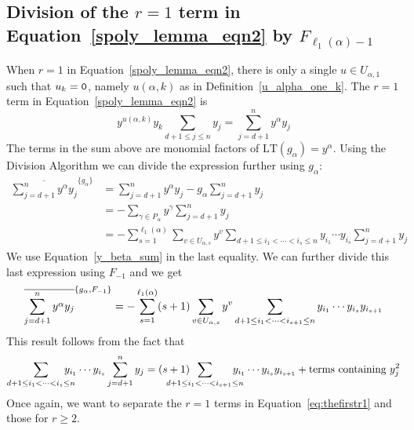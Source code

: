 \documentclass[10pt,a4paper]{article}
\begin{document}
\subsection{Division of the $r=1$ term in Equation~\eqref{spoly_lemma_eqn2} by $F_{\ell_1(\alpha)-1}$}  \label{beta_prime_redu} 
When $r=1$ in Equation~\eqref{spoly_lemma_eqn2}, there is only a single $u\in U_{\alpha,1}$ such that $u_k=\textnormal{\texttt{0}}$, namely $u(\alpha,k)$ as in Definition~\ref{u_alpha_one_k}.
The $r=1$ term in Equation~\eqref{spoly_lemma_eqn2} is 
$$
	 y^{u(\alpha,k)}y_k \sum_{d+1 \leq j \leq n}  y_{j}  = \sum_{j=d+1}^n y^\alpha y_j 
$$
The terms in the sum above are monomial factors of $\text{LT}(g_\alpha) = y^\alpha$.  Using the Division Algorithm we can divide the expression further using $ g_\alpha$:
    \begin{align*}
    \overline{ \sum_{j=d+1}^n y^\alpha y_j }^{\{g_\alpha\}} &=  \sum_{j=d+1}^n y^\alpha y_j - g_\alpha \sum_{j=d+1}^n y_j  \\
    &=  -\sum_{\gamma \in P_\alpha}y^\gamma \sum_{j=d+1}^n y_j \\ 
    &= - \sum_{s=1}^{\ell_1(\alpha)} \sum_{v \in U_{\alpha,s}} y^v \sum_{d+1 \leq i_1 < \cdots < i_s \leq n}y_{i_1} \cdots y_{i_s} \sum_{j=d+1}^n y_j
\end{align*}
We use Equation~\eqref{y_beta_sum} in the last equality. We can further divide this last expression using $F_{-1}$ and we get
\begin{equation}\label{eq:thefirstr1}
    \overline{ \sum_{j=d+1}^n y^\alpha y_j }^{\{g_\alpha,F_{-1}\}} 
    = - \sum_{s=1}^{\ell_1(\alpha)} (s+1) \sum_{v \in U_{\alpha,s}} y^v \sum_{d+1 \leq i_1 < \cdots < i_{s+1} \leq n}y_{i_1} \cdots y_{i_s} y_{i_{s+1}} \\
\end{equation}
This result follows from the fact that 
\begin{align*}
   \sum_{d+1 \leq i_1 < \cdots < i_s \leq n} \hskip-12pt y_{i_1} \cdots y_{i_s} \sum_{j=d+1}^n y_j = (s+1)\hskip-24pt \sum_{d+1 \leq i_1 < \cdots < i_{s+1} \leq n} \hskip-12pt y_{i_1} \cdots y_{i_s} y_{i_{s+1}} + \text{terms containing $y_j^2$}
\end{align*}
Once again, we want to separate the $r=1$ terms in Equation~\eqref{eq:thefirstr1} and those for $r \geq 2$.
\end{document}
